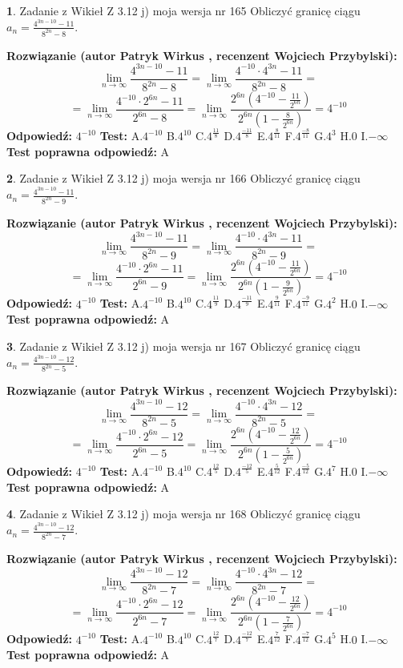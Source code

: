 \documentclass[12pt, a4paper]{article}
\theoremstyle{definition} %
\newtheorem{zad}{}
\newcommand{\zadStart}[1]{\begin{zad}#1\newline}
\newcommand{\zadStop}{\end{zad}}
\newcommand{\rozwStart}[2]{\noindent \textbf{Rozwiązanie (autor #1 , recenzent #2): }\newline}
\newcommand{\rozwStop}{\newline}
\newcommand{\odpStart}{\noindent \textbf{Odpowiedź:}\newline}
\newcommand{\odpStop}{\newline}
\newcommand{\testStart}{\noindent \textbf{Test:}\newline}
\newcommand{\testStop}{\newline}
\newcommand{\kluczStart}{\noindent \textbf{Test poprawna odpowiedź:}\newline}
\newcommand{\kluczStop}{\newline}
\begin{document}
\zadStart{Zadanie z Wikieł Z 3.12 j) moja wersja nr 165}
Obliczyć granicę ciągu $a_{n}=\frac{4^{3n-10}-11}{8^{2n}-8}$.
\zadStop
\rozwStart{Patryk Wirkus}{Wojciech Przybylski}
$$\lim\limits_{n\to\infty}\frac{4^{3n-10}-11}{8^{2n}-8}= \lim\limits_{n\to\infty}\frac{4^{-10} \cdot 4^{3n}-11}{8^{2n}-8}=$$
$$= \lim\limits_{n\to\infty}\frac{4^{-10} \cdot 2^{6n}-11}{2^{6n}-8}= \lim\limits_{n\to\infty}\frac{2^{6n}(4^{-10} - \frac{11}{2^{6n}})}{2^{6n}(1-\frac{8}{2^{6n}})}= 4^{-10}$$
\rozwStop
\odpStart
$4^{-10}$
\odpStop
\testStart
A.$4^{-10}$
B.$4^{10}$
C.$4^{\frac{11}{8}}$
D.$4^{\frac{-11}{8}}$
E.$4^{\frac{8}{11}}$
F.$4^{\frac{-8}{11}}$
G.$4^{3}$
H.$0$
I.$-\infty$
\testStop
\kluczStart
A
\kluczStop



\zadStart{Zadanie z Wikieł Z 3.12 j) moja wersja nr 166}
Obliczyć granicę ciągu $a_{n}=\frac{4^{3n-10}-11}{8^{2n}-9}$.
\zadStop
\rozwStart{Patryk Wirkus}{Wojciech Przybylski}
$$\lim\limits_{n\to\infty}\frac{4^{3n-10}-11}{8^{2n}-9}= \lim\limits_{n\to\infty}\frac{4^{-10} \cdot 4^{3n}-11}{8^{2n}-9}=$$
$$= \lim\limits_{n\to\infty}\frac{4^{-10} \cdot 2^{6n}-11}{2^{6n}-9}= \lim\limits_{n\to\infty}\frac{2^{6n}(4^{-10} - \frac{11}{2^{6n}})}{2^{6n}(1-\frac{9}{2^{6n}})}= 4^{-10}$$
\rozwStop
\odpStart
$4^{-10}$
\odpStop
\testStart
A.$4^{-10}$
B.$4^{10}$
C.$4^{\frac{11}{9}}$
D.$4^{\frac{-11}{9}}$
E.$4^{\frac{9}{11}}$
F.$4^{\frac{-9}{11}}$
G.$4^{2}$
H.$0$
I.$-\infty$
\testStop
\kluczStart
A
\kluczStop



\zadStart{Zadanie z Wikieł Z 3.12 j) moja wersja nr 167}
Obliczyć granicę ciągu $a_{n}=\frac{4^{3n-10}-12}{8^{2n}-5}$.
\zadStop
\rozwStart{Patryk Wirkus}{Wojciech Przybylski}
$$\lim\limits_{n\to\infty}\frac{4^{3n-10}-12}{8^{2n}-5}= \lim\limits_{n\to\infty}\frac{4^{-10} \cdot 4^{3n}-12}{8^{2n}-5}=$$
$$= \lim\limits_{n\to\infty}\frac{4^{-10} \cdot 2^{6n}-12}{2^{6n}-5}= \lim\limits_{n\to\infty}\frac{2^{6n}(4^{-10} - \frac{12}{2^{6n}})}{2^{6n}(1-\frac{5}{2^{6n}})}= 4^{-10}$$
\rozwStop
\odpStart
$4^{-10}$
\odpStop
\testStart
A.$4^{-10}$
B.$4^{10}$
C.$4^{\frac{12}{5}}$
D.$4^{\frac{-12}{5}}$
E.$4^{\frac{5}{12}}$
F.$4^{\frac{-5}{12}}$
G.$4^{7}$
H.$0$
I.$-\infty$
\testStop
\kluczStart
A
\kluczStop



\zadStart{Zadanie z Wikieł Z 3.12 j) moja wersja nr 168}
Obliczyć granicę ciągu $a_{n}=\frac{4^{3n-10}-12}{8^{2n}-7}$.
\zadStop
\rozwStart{Patryk Wirkus}{Wojciech Przybylski}
$$\lim\limits_{n\to\infty}\frac{4^{3n-10}-12}{8^{2n}-7}= \lim\limits_{n\to\infty}\frac{4^{-10} \cdot 4^{3n}-12}{8^{2n}-7}=$$
$$= \lim\limits_{n\to\infty}\frac{4^{-10} \cdot 2^{6n}-12}{2^{6n}-7}= \lim\limits_{n\to\infty}\frac{2^{6n}(4^{-10} - \frac{12}{2^{6n}})}{2^{6n}(1-\frac{7}{2^{6n}})}= 4^{-10}$$
\rozwStop
\odpStart
$4^{-10}$
\odpStop
\testStart
A.$4^{-10}$
B.$4^{10}$
C.$4^{\frac{12}{7}}$
D.$4^{\frac{-12}{7}}$
E.$4^{\frac{7}{12}}$
F.$4^{\frac{-7}{12}}$
G.$4^{5}$
H.$0$
I.$-\infty$
\testStop
\kluczStart
A
\kluczStop
\end{document}
